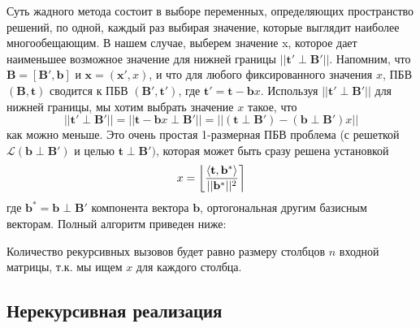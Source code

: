 Суть жадного метода состоит в выборе переменных, определяющих пространство решений, по одной, каждый раз выбирая значение, которые выглядит наиболее многообещающим\cite{lec4}. В нашем случае, выберем значение x, которое дает наименьшее возможное значение для нижней границы $ ||\mathbf{t}' \perp \mathbf{B}' || $. Напомним, что $ \mathbf{B}=\left[\mathbf{B}', \mathbf{b}\right] $ и $ \mathbf{x}=\left(\mathbf{x}' ,x\right) $, и что для любого фиксированного значения $ x $, ПБВ $ (\mathbf{B}, \mathbf{t}) $ сводится к ПБВ $ (\mathbf{B}',\mathbf{t}') $, где $ \mathbf{t}'=\mathbf{t}-\mathbf{b}x $. Используя $ ||\mathbf{t}' \perp \mathbf{B}' || $ для нижней границы, мы хотим выбрать значение $ x $ такое, что 
$$ || \mathbf{t}' \perp \mathbf{B}' || = || \mathbf{t} - \mathbf{b}x \perp \mathbf{B}' || = || (\mathbf{t} \perp \mathbf{B}') - (\mathbf{b} \perp \mathbf{B}')x || $$ 
как можно меньше. Это очень простая 1-размерная ПБВ проблема (с решеткой $ \mathcal{L}\left(\mathbf{b} \perp \mathbf{B}'\right) $ и целью $ \mathbf{t} \perp \mathbf{B}') $, которая может быть сразу решена установкой
$$ x = \left\lfloor \left\langle \mathbf{t},\mathbf{b}^* \right\rangle \over ||\mathbf{b}^*||^2 \right\rceil $$
где $ \mathbf{b}^* = \mathbf{b} \perp \mathbf{B}' $ компонента вектора $ \mathbf{b} $, ортогональная другим базисным векторам. Полный алгоритм приведен ниже: \newline

\begin{algorithmic}

\end{algorithmic}

Количество рекурсивных вызовов будет равно размеру столбцов $ n $ входной матрицы, т.к. мы ищем $ x $ для каждого столбца.

\subsection{Нерекурсивная реализация}

